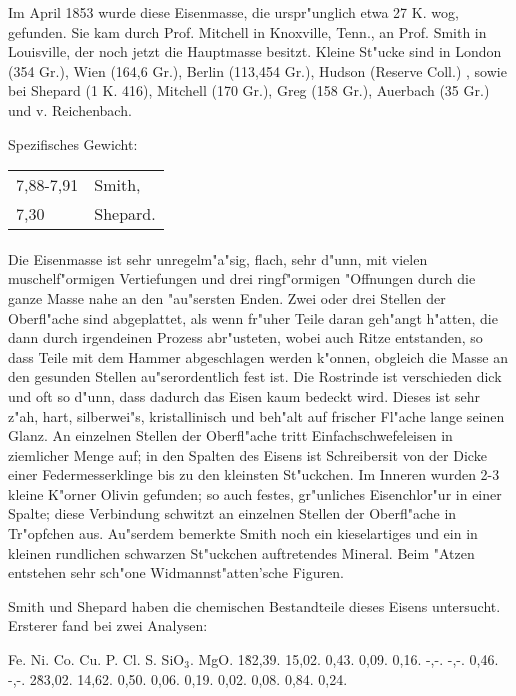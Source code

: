 \documentclass[a4paper, 11pt, oneside]{article}
\begin{document}
Im April 1853 wurde diese Eisenmasse, die urspr"unglich etwa 27 K. wog, gefunden. Sie kam durch Prof. Mitchell in Knoxville, Tenn., an Prof. Smith in Louisville, der noch jetzt die Hauptmasse besitzt. Kleine St"ucke sind in London (354 Gr.), Wien (164,6 Gr.), Berlin (113,454 Gr.), Hudson (Reserve Coll.) , sowie bei Shepard (1 K. 416), Mitchell (170 Gr.), Greg (158 Gr.), Auerbach (35 Gr.) und v. Reichenbach.

Spezifisches Gewicht:  
\begin{table}[!ht]
    \centering
    \begin{tabular}{l l}
        7,88-7,91 & Smith,\\
        7,30 & Shepard.
    \end{tabular}
\end{table}
\paragraph{}
Die Eisenmasse ist sehr unregelm"a"sig, flach, sehr d"unn, mit vielen muschelf"ormigen Vertiefungen und drei ringf"ormigen "Offnungen durch die ganze Masse nahe an den "au"sersten Enden. Zwei oder drei Stellen der Oberfl"ache sind abgeplattet, als wenn fr"uher Teile daran geh"angt h"atten, die dann durch irgendeinen Prozess abr"usteten, wobei auch Ritze entstanden, so dass Teile mit dem Hammer abgeschlagen werden k"onnen, obgleich die Masse an den gesunden Stellen au"serordentlich fest ist. Die Rostrinde ist verschieden dick und oft so d"unn, dass dadurch das Eisen kaum bedeckt wird. Dieses ist sehr z"ah, hart, silberwei"s, kristallinisch und beh"alt auf frischer Fl"ache lange seinen Glanz. An einzelnen Stellen der Oberfl"ache tritt Einfachschwefeleisen in ziemlicher Menge auf; in den Spalten des Eisens ist Schreibersit von der Dicke einer Federmesserklinge bis zu den kleinsten St"uckchen. Im Inneren wurden 2-3 kleine K"orner Olivin gefunden; so auch festes, gr"unliches Eisenchlor"ur in einer Spalte; diese Verbindung schwitzt an einzelnen Stellen der Oberfl"ache in Tr"opfchen aus. Au"serdem bemerkte Smith noch ein kieselartiges und ein in kleinen rundlichen schwarzen St"uckchen auftretendes Mineral. Beim "Atzen entstehen sehr sch"one Widmannst"atten'sche Figuren.

Smith und Shepard haben die chemischen Bestandteile dieses Eisens untersucht. Ersterer fand bei zwei Analysen:

Fe. Ni. Co. Cu. P. Cl. S. SiO$_{3}$. MgO.  
1\. 82,39. 15,02. 0,43. 0,09. 0,16. -,-. -,-. 0,46. -,-.  
2\. 83,02. 14,62. 0,50. 0,06. 0,19. 0,02. 0,08. 0,84. 0,24.
\end{document}
